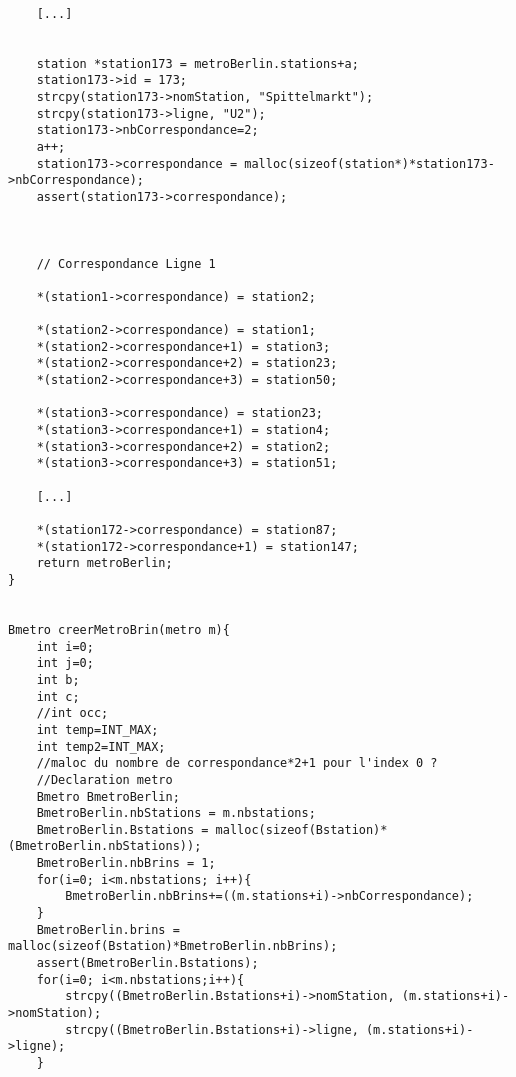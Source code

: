 \begin{verbatim}
	
	[...]


	station *station173 = metroBerlin.stations+a;
	station173->id = 173;
	strcpy(station173->nomStation, "Spittelmarkt");
	strcpy(station173->ligne, "U2");
	station173->nbCorrespondance=2;
	a++;
	station173->correspondance = malloc(sizeof(station*)*station173->nbCorrespondance);
	assert(station173->correspondance);



	// Correspondance Ligne 1

	*(station1->correspondance) = station2;

	*(station2->correspondance) = station1;
	*(station2->correspondance+1) = station3;
	*(station2->correspondance+2) = station23;
	*(station2->correspondance+3) = station50;

	*(station3->correspondance) = station23;
	*(station3->correspondance+1) = station4;
	*(station3->correspondance+2) = station2;
	*(station3->correspondance+3) = station51;

	[...]

	*(station172->correspondance) = station87;
	*(station172->correspondance+1) = station147;
	return metroBerlin;
}


Bmetro creerMetroBrin(metro m){
	int i=0;
	int j=0;
	int b;
	int c;
	//int occ;
	int temp=INT_MAX;
	int temp2=INT_MAX;
	//maloc du nombre de correspondance*2+1 pour l'index 0 ?
	//Declaration metro
	Bmetro BmetroBerlin;
	BmetroBerlin.nbStations = m.nbstations;
	BmetroBerlin.Bstations = malloc(sizeof(Bstation)*(BmetroBerlin.nbStations));
	BmetroBerlin.nbBrins = 1;
	for(i=0; i<m.nbstations; i++){
		BmetroBerlin.nbBrins+=((m.stations+i)->nbCorrespondance);
	}
	BmetroBerlin.brins = malloc(sizeof(Bstation)*BmetroBerlin.nbBrins);
	assert(BmetroBerlin.Bstations);
	for(i=0; i<m.nbstations;i++){
		strcpy((BmetroBerlin.Bstations+i)->nomStation, (m.stations+i)->nomStation);
		strcpy((BmetroBerlin.Bstations+i)->ligne, (m.stations+i)->ligne);
	}
	

\end{verbatim}
